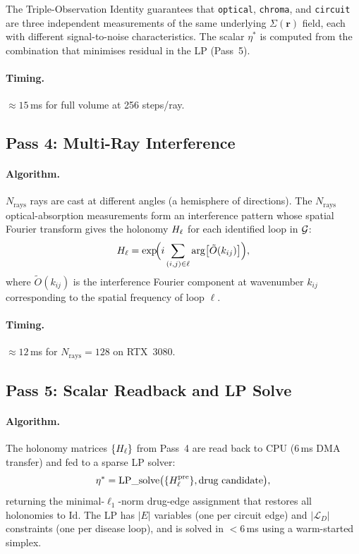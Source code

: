 The Triple-Observation Identity guarantees that \texttt{optical},
\texttt{chroma}, and \texttt{circuit} are three independent measurements of
the same underlying $\Sigma(\mathbf{r})$ field, each with different
signal-to-noise characteristics.  The scalar $\eta^*$ is computed from the
combination that minimises residual in the LP (Pass~5).

\paragraph{Timing.} $\approx 15$\,ms for full volume at 256 steps/ray.

\subsection{Pass 4: Multi-Ray Interference}
\label{subsec:ch09-gpu-pass4}

\paragraph{Algorithm.} $N_{\mathrm{rays}}$ rays are cast at different angles
(a hemisphere of directions).  The $N_{\mathrm{rays}}$ optical-absorption
measurements form an interference pattern whose spatial Fourier transform
gives the holonomy $H_\ell$ for each identified loop in $\mathcal{G}$:
\begin{equation}
  H_{\ell} = \exp\!\Bigl(i\sum_{(i,j)\in\ell}
      \arg\bigl[\tilde{O}(k_{ij})\bigr]\Bigr),
  \label{eq:ch09-gpu-interference}
\end{equation}
where $\tilde{O}(k_{ij})$ is the interference Fourier component at wavenumber
$k_{ij}$ corresponding to the spatial frequency of loop $\ell$.

\paragraph{Timing.} $\approx 12$\,ms for $N_{\mathrm{rays}} = 128$ on RTX~3080.

\subsection{Pass 5: Scalar Readback and LP Solve}
\label{subsec:ch09-gpu-pass5}

\paragraph{Algorithm.} The holonomy matrices $\{H_{\ell}\}$ from Pass~4
are read back to CPU (6\,ms DMA transfer) and fed to a sparse LP solver:
\begin{equation}
  \eta^* = \mathrm{LP\_solve}\bigl(\{H_\ell^{\mathrm{pre}}\},
      \text{drug candidate}\bigr),
  \label{eq:ch09-gpu-lp}
\end{equation}
returning the minimal-$\ell_1$-norm drug-edge assignment that restores all
holonomies to $\mathrm{Id}$.  The LP has $|E|$ variables (one per circuit edge)
and $|\mathcal{L}_D|$ constraints (one per disease loop), and is solved in
$< 6$\,ms using a warm-started simplex.

